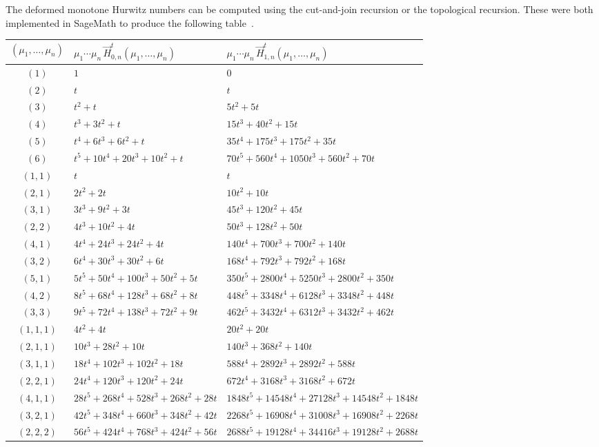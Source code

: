 \documentclass[a4paper]{article}
\theoremstyle{plain}
\numberwithin{theorem}{section}
\theoremstyle{definition}
\theoremstyle{remark}
\newcommand{\HN}[3]{\vec{H}^t_{#1,#2}(#3)}
\begin{document}
The deformed monotone Hurwitz numbers can be computed using the cut-and-join recursion or the topological recursion. These were both implemented in SageMath to produce the following table~\cite{sagemath}.


\begin{center}
\begin{tabularx}{\textwidth}{cXX} \toprule
$(\mu_1, \ldots, \mu_n)$ & $\mu_1 \cdots \mu_n \, \HN{0}{n}{\mu_1, \ldots, \mu_n}$ & $\mu_1 \cdots \mu_n \, \HN{1}{n}{\mu_1, \ldots, \mu_n}$ \\ \midrule
$(1)$ & $1$ & $0$ \\
$(2)$ & $t$ & $t$ \\
$(3)$ & $t^2 + t$ & $5t^2 + 5t$ \\
$(4)$ & $t^3 + 3t^2 + t$ & $15t^3 + 40t^2 + 15t$ \\
$(5)$ & $t^4 + 6t^3 + 6t^2 + t$ & $35t^4 + 175t^3 + 175t^2 + 35t$ \\
$(6)$ & $t^5 + 10t^4 + 20t^3 + 10t^2 + t$ & $70t^5 + 560t^4 + 1050t^3 + 560t^2 + 70t$ \\ \midrule
$(1,1)$ & $t$ & $t$ \\
$(2,1)$ & $2t^2 + 2t$ & $10t^2 + 10t$ \\
$(3,1)$ & $3t^3 + 9t^2 + 3t$ & $45t^3 + 120t^2 + 45t$ \\
$(2,2)$ & $4t^3 + 10t^2 + 4t$ & $50t^3 + 128t^2 + 50t$ \\
$(4,1)$ & $4t^4 + 24t^3 + 24t^2 + 4t$ & $140t^4 + 700t^3 + 700t^2 + 140t$ \\
$(3,2)$ & $6t^4 + 30t^3 + 30t^2 + 6t$ & $168t^4 + 792t^3 + 792t^2 + 168t$ \\
$(5,1)$ & $5t^5 + 50t^4 + 100t^3 + 50t^2 + 5t$ & $350t^5 + 2800t^4 + 5250t^3 + 2800t^2 + 350t$ \\
$(4,2)$ & $8t^5 + 68t^4 + 128t^3 + 68t^2 + 8t$ & $448t^5 + 3348t^4 + 6128t^3 + 3348t^2 + 448t$ \\
$(3,3)$ & $9t^5 + 72t^4 + 138t^3 + 72t^2 + 9t$ & $462t^5 + 3432t^4 + 6312t^3 + 3432t^2 + 462t$ \\ \midrule
$(1,1,1)$ & $4t^2 + 4t$ & $20t^2 + 20t$ \\
$(2,1,1)$ & $10t^3 + 28t^2 + 10t$ & $140t^3 + 368t^2 + 140t$ \\
$(3,1,1)$ & $18t^4 + 102t^3 + 102t^2 + 18t$ & $588t^4 + 2892t^3 + 2892t^2 + 588t$ \\
$(2,2,1)$ & $24t^4 + 120t^3 + 120t^2 + 24t$ & $672t^4 + 3168t^3 + 3168t^2 + 672t$ \\
$(4,1,1)$ & $28t^5 + 268t^4 + 528t^3 + 268t^2 + 28t$ & $1848t^5 + 14548t^4 + 27128t^3 + 14548t^2 + 1848t$ \\
$(3,2,1)$ & $42t^5 + 348t^4 + 660t^3 + 348t^2 + 42t$ & $2268t^5 + 16908t^4 + 31008t^3 + 16908t^2 + 2268t$ \\
$(2,2,2)$ & $56t^5 + 424t^4 + 768t^3 + 424t^2 + 56t$ & $2688t^5 + 19128t^4 + 34416t^3 + 19128t^2 + 2688t$ \\ \bottomrule
\end{tabularx}
\end{center}
\end{document}
